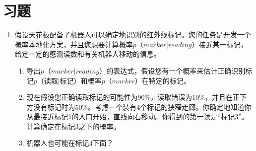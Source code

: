 \section*{习题}\small
\begin{enumerate}

\item 假设天花板配备了机器人可以确定地识别的红外线标记。您的任务是开发一个概率本地化方案，并且您想要计算概率$p（marker|reading）$接近某一标记，给定一定的感测读数和有关机器人移动的信息。
\begin{enumerate}

\item 导出$p（marker|reading）$的表达式，假设您有一个概率来估计正确识别标记$p（读取|标记）$和概率$p（marker）$在特定的标记。
\item 现在假设您正确读取标记的可能性为90\%，读取错误为10\%，并且在正下方没有标记时为50\%。考虑一个装有4个标记的狭窄走廊。你确定地知道你从最接近标记1的入口开始，直线向右移动。你得到的第一读是“标记3”。计算确定在标记3之下的概率。
\item 机器人也可能在标记4下面？
\end{enumerate}
\end{enumerate}\normalsize